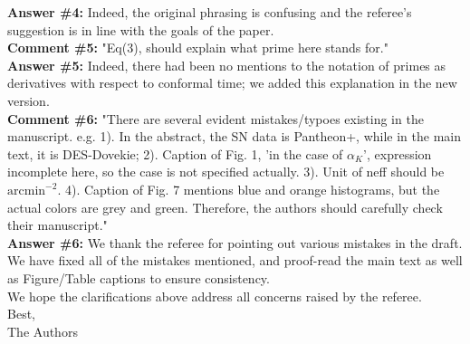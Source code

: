 \documentclass{article}
\begin{document}
    \textbf{Answer \#4:} Indeed, the original phrasing is confusing and the referee's suggestion is in line with the goals of the paper.\\

    \textbf{Comment \#5:} "Eq(3), should explain what prime here stands for."\\

    \textbf{Answer \#5:} Indeed, there had been no mentions to the notation of primes as derivatives with respect to conformal time; we added this explanation in the new version. \\
    
    \textbf{Comment \#6:} "There are several evident mistakes/typoes existing in the manuscript. e.g. 1). In the abstract, the SN data is Pantheon+, while in the main text, it is DES-Dovekie; 2). Caption of Fig. 1, 'in the case of $\alpha_K$', expression incomplete here, so the case is not specified actually. 3). Unit of neff should be $\mathrm{arcmin}^{-2}$. 4). Caption of Fig. 7 mentions blue and orange histograms, but the actual colors are grey and green. Therefore, the authors should carefully check their manuscript." \\

    \textbf{Answer \#6:} We thank the referee for pointing out various mistakes in the draft. We have fixed all of the mistakes mentioned, and proof-read the main text as well as Figure/Table captions to ensure consistency. \\

    We hope the clarifications above address all concerns raised by the referee. \\

    Best, \\
    
    The Authors
    
\end{document}
